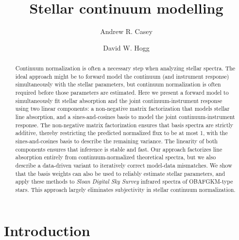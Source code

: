 \documentclass[modern]{aastex631}
\newcommand{\chosentitle}{Stellar continuum modelling}
\newcommand{\project}[1]{\textit{#1}}
\begin{document}
\title{\chosentitle}

\author[0000-0003-0174-0564]{Andrew R. Casey}

\author[0000-0003-2866-9403]{David W. Hogg}



\begin{abstract}\noindent
Continuum normalization is often a necessary step when analyzing stellar spectra. 
The ideal approach might be to forward model the continuum (and instrument response) simultaneously with the stellar parameters, but continuum normalization is often required before those parameters are estimated.
Here we present a forward model to simultaneously fit stellar absorption and the joint continuum-instrument response using two linear components: a non-negative matrix factorization that models stellar line absorption, and a sines-and-cosines basis to model the joint continuum-instrument response.
The non-negative matrix factorization ensures that basis spectra are strictly additive, thereby restricting the predicted normalized flux to be at most 1, with the sines-and-cosines basis to describe the remaining variance.
The linearity of both components ensures that inference is stable and fast.
Our approach factorizes line absorption entirely from continuum-normalized theoretical spectra, but we also describe a data-driven variant to iteratively correct model-data mismatches.
We show that the basis weights can also be used to reliably estimate stellar parameters, and apply these methods to \project{Sloan Digital Sky Survey} infrared spectra of OBAFGKM-type stars.
This approach largely eliminates subjectivity in stellar continuum normalization.
\end{abstract}


\section*{}\clearpage
\section{Introduction}\label{sec:intro}
\end{document}
